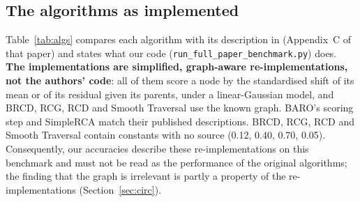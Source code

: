 \documentclass[11pt]{article}
\begin{document}
\subsection{The algorithms as implemented}
Table~\ref{tab:algs} compares each algorithm with its description in \citet{lee2026brcd} (Appendix~C of that paper) and states what our code (\texttt{run\_full\_paper\_benchmark.py}) does. \textbf{The implementations are simplified, graph-aware re-implementations, not the authors' code}: all of them score a node by the standardised shift of its mean or of its residual given its parents, under a linear-Gaussian model, and BRCD, RCG, RCD and Smooth Traversal use the known graph. BARO's scoring step and SimpleRCA match their published descriptions. BRCD, RCG, RCD and Smooth Traversal contain constants with no source (0.12, 0.40, 0.70, 0.05). Consequently, our accuracies describe these re-implementations on this benchmark and must not be read as the performance of the original algorithms; the finding that the graph is irrelevant is partly a property of the re-implementations (Section~\ref{sec:circ}).
\end{document}
